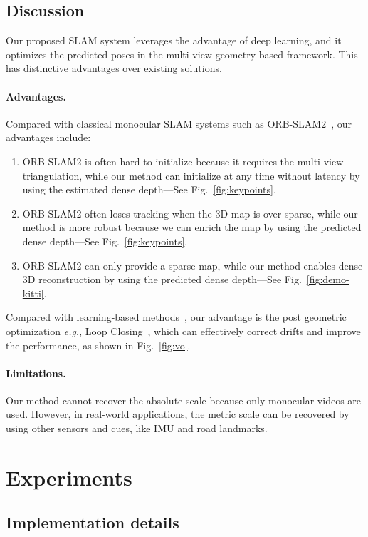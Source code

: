 \documentclass[twocolumn]{svjour3}
\renewcommand{\cite}[1]{\textcolor{blue}{\citep{#1}}}
\def\eg{\emph{e.g.}}
\newcommand{\figref}[1]{Fig.~\ref{#1}}
\begin{document}
\subsection{Discussion}\label{sec-slam-discussion}


Our proposed SLAM system leverages the advantage of deep learning,
and it optimizes the predicted poses in the multi-view geometry-based framework.
This has distinctive advantages over existing solutions.

\paragraph{Advantages.}
Compared with classical monocular SLAM systems such as ORB-SLAM2~\cite{murORB2}, 
our advantages include:
\begin{enumerate}
  \item ORB-SLAM2 is often hard to initialize because it requires the multi-view triangulation,
  while our method can initialize at any time without latency by using the estimated dense depth---See \figref{fig:keypoints}.
  \item ORB-SLAM2 often loses tracking when the 3D map is over-sparse,
    while our method is more robust because we can enrich the map by using the predicted dense depth---See \figref{fig:keypoints}.
  \item  ORB-SLAM2 can only provide a sparse map,
  while our method enables dense 3D reconstruction by using the predicted dense depth---See \figref{fig:demo-kitti}. 
\end{enumerate}
Compared with learning-based methods~\cite{li2018undeepvo},
our advantage is the post geometric optimization \eg, Loop Closing~\cite{mur2014fast},
which can effectively correct drifts and improve the performance,
as shown in \figref{fig:vo}.

\paragraph{Limitations.}
Our method cannot recover the absolute scale because only monocular videos are used.
However, in real-world applications, the metric scale can be recovered by using other sensors and cues, like IMU and road landmarks.


\section{Experiments}

\subsection{Implementation details}\label{sec-implement-details}
\end{document}
